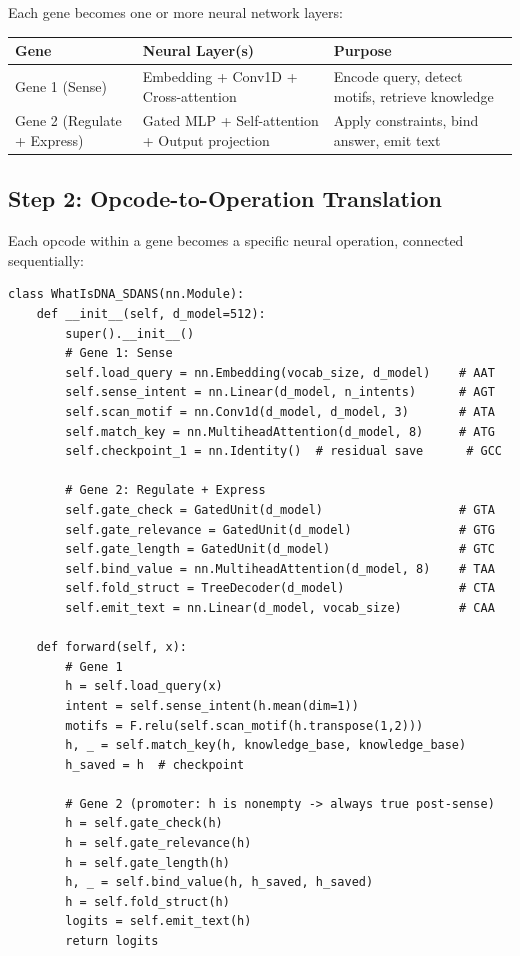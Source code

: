 Each gene becomes one or more neural network layers:

\begin{center}
\renewcommand{\arraystretch}{1.15}
\small
\begin{tabularx}{0.97\textwidth}{L{2.5cm} L{3cm} Y}
\toprule
\textbf{Gene} & \textbf{Neural Layer(s)} & \textbf{Purpose} \\
\midrule
Gene 1 (Sense) & Embedding + Conv1D + Cross-attention & Encode query, detect motifs, retrieve knowledge \\
Gene 2 (Regulate + Express) & Gated MLP + Self-attention + Output projection & Apply constraints, bind answer, emit text \\
\bottomrule
\end{tabularx}
\end{center}

\subsection{Step 2: Opcode-to-Operation Translation}

Each opcode within a gene becomes a specific neural operation, connected sequentially:

\begin{lstlisting}[style=dogmapython, caption={SDANS-compiled neural architecture (PyTorch-like pseudocode).}]
class WhatIsDNA_SDANS(nn.Module):
    def __init__(self, d_model=512):
        super().__init__()
        # Gene 1: Sense
        self.load_query = nn.Embedding(vocab_size, d_model)    # AAT
        self.sense_intent = nn.Linear(d_model, n_intents)      # AGT
        self.scan_motif = nn.Conv1d(d_model, d_model, 3)       # ATA
        self.match_key = nn.MultiheadAttention(d_model, 8)     # ATG
        self.checkpoint_1 = nn.Identity()  # residual save      # GCC

        # Gene 2: Regulate + Express
        self.gate_check = GatedUnit(d_model)                   # GTA
        self.gate_relevance = GatedUnit(d_model)               # GTG
        self.gate_length = GatedUnit(d_model)                  # GTC
        self.bind_value = nn.MultiheadAttention(d_model, 8)    # TAA
        self.fold_struct = TreeDecoder(d_model)                # CTA
        self.emit_text = nn.Linear(d_model, vocab_size)        # CAA

    def forward(self, x):
        # Gene 1
        h = self.load_query(x)
        intent = self.sense_intent(h.mean(dim=1))
        motifs = F.relu(self.scan_motif(h.transpose(1,2)))
        h, _ = self.match_key(h, knowledge_base, knowledge_base)
        h_saved = h  # checkpoint

        # Gene 2 (promoter: h is nonempty -> always true post-sense)
        h = self.gate_check(h)
        h = self.gate_relevance(h)
        h = self.gate_length(h)
        h, _ = self.bind_value(h, h_saved, h_saved)
        h = self.fold_struct(h)
        logits = self.emit_text(h)
        return logits
\end{lstlisting}


